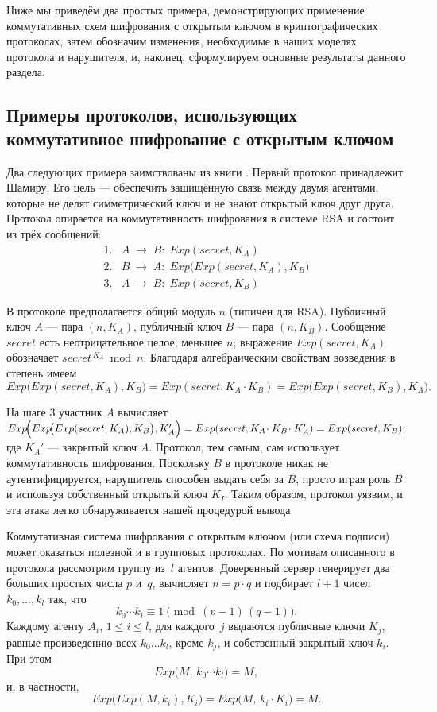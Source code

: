 Ниже мы приведём два простых примера, демонстрирующих применение
коммутативных схем шифрования с открытым ключом в криптографических
протоколах, затем обозначим изменения, необходимые в наших моделях
протокола и нарушителя, и, наконец, сформулируем основные результаты
данного раздела.

\subsection{Примеры протоколов, использующих коммутативное шифрование с открытым ключом}

Два следующих примера заимствованы из книги \cite{Schneier1996}.  
Первый протокол принадлежит Шамиру. Его цель — обеспечить защищённую
связь между двумя агентами, которые не делят симметрический ключ и не
знают открытый ключ друг друга. Протокол опирается на
коммутативность шифрования в системе RSA и состоит из трёх сообщений:
\[
\begin{array}{ll}
1.& A \;\rightarrow\; B :\; Exp(\mathit{secret},K_{A}) \\[2pt]
2.& B \;\rightarrow\; A :\; Exp\!\bigl(Exp(\mathit{secret},K_{A}),K_{B}\bigr) \\[2pt]
3.& A \;\rightarrow\; B :\; Exp(\mathit{secret},K_{B})
\end{array}
\]

В протоколе предполагается общий модуль $n$ (типичен для RSA).  
Публичный ключ $A$ — пара $(n,K_{A})$, публичный ключ $B$ — пара
$(n,K_{B})$. Сообщение $\mathit{secret}$ есть неотрицательное целое,
меньшее $n$; выражение $Exp(\mathit{secret},K_{A})$ обозначает
$\mathit{secret}^{\,K_{A}}\bmod n$.  
Благодаря алгебраическим свойствам возведения в степень имеем
\(
   Exp\!\bigl(Exp(\mathit{secret},K_{A}),K_{B}\bigr)
    = Exp(\mathit{secret},K_{A}\!\cdot K_{B})
    = Exp\!\bigl(Exp(\mathit{secret},K_{B}),K_{A}\bigr).
\)

На шаге 3 участник $A$ вычисляет
\(
   Exp\!\Bigl(
      Exp\!\bigl(Exp(\mathit{secret},K_{A}),K_{B}\bigr),
      K_{A}'\Bigr)
   = Exp(\mathit{secret},K_{A}\!\cdot K_{B}\!\cdot K_{A}')
   = Exp(\mathit{secret},K_{B}),
\)
где $K_{A}'$ — закрытый ключ $A$. Протокол, тем самым, сам использует
коммутативность шифрования.  
Поскольку $B$ в протоколе никак не аутентифицируется,
нарушитель способен выдать себя за $B$, просто играя роль $B$ и
используя собственный открытый ключ $K_{I}$. Таким образом,
протокол уязвим, и эта атака легко обнаруживается нашей
процедурой вывода.

Коммутативная система шифрования с открытым ключом (или схема подписи) 
может оказаться полезной и в групповых протоколах. 
По мотивам описанного в \cite[гл.~23]{Schneier1996} протокола 
рассмотрим группу из~$l$ агентов. 
Доверенный сервер генерирует два больших простых числа $p$ и~$q$, 
вычисляет $n = p\cdot q$ и подбирает $l+1$ чисел 
$k_{0},\dots,k_{l}$ так, что 
\[
  k_{0}\cdots k_{l}\equiv 1 \pmod{(p-1)\,(q-1)}.
\] 
Каждому агенту $A_{i}$, $1\le i\le l$, для каждого~$j$ выдаются
публичные ключи $K_{j}$, равные произведению всех $k_{0}\dots k_{l}$, 
кроме $k_{j}$, и собственный закрытый ключ $k_{i}$. 
При этом 
\[
  Exp\bigl(M,\,k_{0}\cdots k_{l}\bigr)=M,
\]
и, в частности,
\[
   Exp\!\bigl(Exp(M,k_{i}),K_{i}\bigr)=
   Exp\!\bigl(M,\,k_{i}\!\cdot\!K_{i}\bigr)=M.
\]

